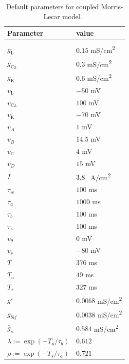 \documentclass[utf8]{frontiers_suppmat} %
\renewcommand{\k}{\mathrm{K}}
\newcommand{\ca}{\mathrm{Ca}}
\newcommand{\leak}{\mathrm{L}}
\begin{document}
\begin{table}[h]
	\caption{Default parameters for coupled Morris-Lecar model.~\label{tab:pars}}
	\centering
	\begin{tabular}{ll}
		Parameter                      & value                 \\
		\hline
		                               &                       \\
		$g_{\leak}$                    & $0.15$ \si{mS/cm^2}   \\
		$g_{\ca}$                      & $0.3$ \si{mS/cm^2}    \\
		$g_{\k}$                       & $0.6$ \si{mS/cm^2}    \\
		$v_{\leak}$                    & $-50$ \si{mV}         \\
		$v_{\ca}$                      & $100$ \si{mV}         \\
		$v_{\k}$                       & $-70$ \si{mV}         \\
		$v_{A}$                        & $1$ \si{mV}           \\
		$v_{B}$                        & $14.5$ \si{mV}        \\
		$v_{C}$                        & $4$ \si{mV}           \\
		$v_{D}$                        & $15$ \si{mV}          \\
		$I$                            & $3.8$ \si{\mu A/cm^2} \\
		$\tau_w$                       & $100$ \si{ms}         \\
		$\tau_a$                       & $1000$ \si{ms}        \\
		$\tau_b$                       & $100$ \si{ms}         \\
		$\tau_\kappa$                  & $100$ \si{ms}         \\
		$v_{\theta}$                   & $0$ \si{mV}           \\
		$v_{s}$                        & $-80$ \si{mV}         \\
		$T$                            & $376$ \si{ms}         \\
		$T_{a}$                        & $49$ \si{ms}          \\
		$T_{s}$                        & $327$ \si{ms}         \\
		$g^{\star}$                    & $0.0068$ \si{mS/cm^2} \\
		$g_{bif}$                      & $0.0038$ \si{mS/cm^2} \\
		$\bar g_{s}$                   & $0.584$ \si{mS/cm^2}  \\
		$\lambda:=\exp(-T_{a}/\tau_b)$ & $0.612$               \\
		$\rho:=\exp(-T_{s}/\tau_a)$    & $0.721$               \\
	\end{tabular}
\end{table}
\end{document}
